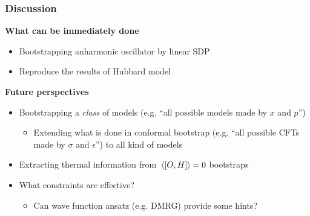 \documentclass{beamer}
\begin{document}
\begin{frame}
\frametitle{Discussion}

\textbf{What can be immediately done}

\begin{itemize}
    \item Bootstrapping anharmonic oscillator by linear SDP
    \item Reproduce the results of Hubbard model 
\end{itemize}

\textbf{Future perspectives}

\begin{itemize}
    \item Bootstrapping a \emph{class} of models (e.g. ``all possible models made by $x$ and $p$'')
    \begin{itemize}
        \item Extending what is done in conformal bootstrap (e.g. ``all possible CFTs made by $\sigma$ and $\epsilon$'') to all kind of models
    \end{itemize}
    \item Extracting thermal information from $\expval*{\comm{O}{H}} = 0$ bootstraps
    \item What constraints are effective? 
    \begin{itemize}
        \item Can wave function ansatz (e.g. DMRG) provide some hints?
    \end{itemize}
\end{itemize}

\end{frame}
\end{document}
